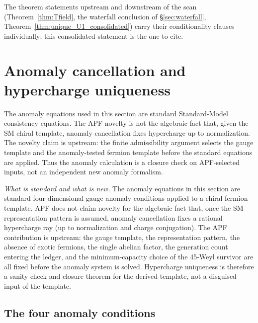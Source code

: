 \documentclass[11pt]{article}
\theoremstyle{definition}
\begin{document}
\noindent The theorem statements upstream and downstream of the scan
(Theorem~\ref{thm:Tfield}, the waterfall conclusion of
\S\ref{sec:waterfall}, Theorem~\ref{thm:unique_U1_consolidated}) carry
their conditionality clauses individually; this consolidated statement
is the one to cite.


\newpage


\section{Anomaly cancellation and hypercharge uniqueness}
\label{sec:hypercharge}


\begin{tcolorbox}[apfbox, title={Novelty boundary: standard anomaly algebra versus APF input selection}]
\footnotesize
The anomaly equations used in this section are standard Standard-Model
consistency equations.  The APF novelty is not the algebraic fact that,
given the SM chiral template, anomaly cancellation fixes hypercharge up to
normalization.  The novelty claim is upstream: the finite admissibility
argument selects the gauge template and the anomaly-tested fermion template
before the standard equations are applied.  Thus the anomaly calculation is
a closure check on APF-selected inputs, not an independent new anomaly
formalism.
\end{tcolorbox}

\noindent\textit{What is standard and what is new.}\quad
The anomaly equations in this section are standard four-dimensional gauge
anomaly conditions applied to a chiral fermion template.  APF does not
claim novelty for the algebraic fact that, once the SM representation
pattern is assumed, anomaly cancellation fixes a rational hypercharge ray
(up to normalization and charge conjugation).  The APF contribution is
upstream: the gauge template, the representation pattern, the absence of
exotic fermions, the single abelian factor, the generation count entering
the ledger, and the minimum-capacity choice of the 45-Weyl survivor are
all fixed before the anomaly system is solved.  Hypercharge uniqueness is
therefore a sanity check and closure theorem for the derived template, not
a disguised input of the template.


\subsection{The four anomaly conditions}
\label{sec:anomaly_conditions}
\end{document}
